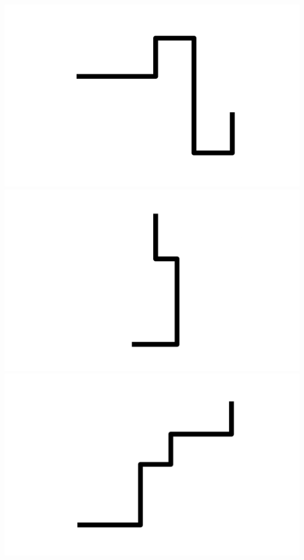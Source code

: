 \documentclass[]{report}
\begin{document}
\includegraphics[scale=.1]{pictures/21/state_cluster_shapes_106.pdf} 
\includegraphics[scale=.1]{pictures/21/state_cluster_shapes_107.pdf} 
\includegraphics[scale=.1]{pictures/21/state_cluster_shapes_108.pdf} 
\end{document}
